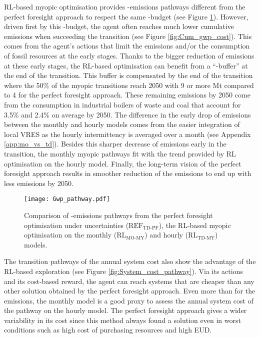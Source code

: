 \gls{RL}-based myopic optimisation provides -emissions pathways different from the perfect foresight approach to respect the same -budget (see Figure \ref{fig:Gwp_pathway}). However, driven first by this -budget, the agent often reaches much lower cumulative emissions when succeeding the transition (see Figure \ref{fig:Cum_gwp_cost}). This comes from the agent's actions that limit the emissions and/or the consumption of fossil resources at the early stages. Thanks to the bigger reduction of emissions at these early stages, the \gls{RL}-based optimisation can benefit from a ``-buffer'' at the end of the transition. This buffer is compensated by the end of the transition where the 50\% of the myopic transitions reach 2050 with 9 or more Mt compared to 4 for the perfect foresight approach. These remaining emissions by 2050 come from the consumption in industrial boilers of waste and coal that account for 3.5\% and 2.4\% on average by 2050. The difference in the early drop of emissions between the monthly and hourly models comes from the easier integration of local \gls{VRES} as the hourly intermittency is averaged over a month (see Appendix \ref{app:mo_vs_td}). Besides this sharper decrease of emissions early in the transition, the monthly myopic pathways fit with the trend provided by \gls{RL} optimisation on the hourly model. Finally, the long-term vision of the perfect foresight approach results in smoother reduction of the emissions to end up with less emissions by 2050.

\begin{figure}[!htbp]
\centering
\texttt{[image: Gwp\_pathway.pdf]}
\caption{Comparison of -emissions pathways from the perfect foresight optimisation under uncertainties ($\text{REF}_{\text{TD-PF}}$), the \gls{RL}-based myopic optimisation on the monthly ($\text{RL}_{\text{MO-MY}}$) and hourly ($\text{RL}_{\text{TD-MY}}$) models.}
\label{fig:Gwp_pathway}
\end{figure}

The transition pathways of the annual system cost also show the advantage of the \gls{RL}-based exploration (see Figure \ref{fig:System_cost_pathway}). Via its actions and its cost-based reward, the agent can reach systems that are cheaper than any other solution obtained by the perfect foresight approach. Even more than for the emissions, the monthly model is a good proxy to assess the annual system cost of the pathway on the hourly model. The perfect foresight approach gives a wider variability in its cost since this method always found a solution even in worst conditions such as high cost of purchasing resources and high \gls{EUD}. 

